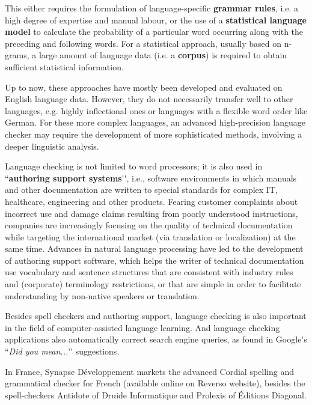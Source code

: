 \documentclass[]{../metanetpaper}
\begin{document}
\begin{multicols}{2}
This either requires the formulation of language-specific {\bf grammar
rules}, i.e. a high degree of expertise and manual labour, or the use
of a {\bf statistical language model} to calculate the probability of a
particular word occurring along with the preceding and following
words. For a statistical approach, usually based on n-grams, a large
amount of language data (i.e. a {\bf corpus}) is required to obtain
sufficient statistical information.  

Up to now, these approaches have mostly been developed and evaluated
on English language data. However, they do not necessarily transfer
well to other languages, e.g. highly inflectional ones or languages
with a flexible word order like German. For these more complex
languages, an advanced high-precision language checker may require the
development of more sophisticated methods, involving a deeper
linguistic analysis.

Language checking is not limited to word processors; it is also used
in ``{\bf authoring support systems}{\mbox '}{\mbox '}, i.e., software environments in which
manuals and other documentation are written to special standards for
complex IT, healthcare, engineering and other products. Fearing
customer complaints about incorrect use and damage claims resulting
from poorly understood instructions, companies are increasingly
focusing on the quality of technical documentation while targeting the
international market (via translation or localization) at the same
time. Advances in natural language processing have led to the
development of authoring support software, which helps the writer of
technical documentation use vocabulary and sentence structures that
are consistent with industry rules and (corporate) terminology
restrictions, or that are simple in order to facilitate understanding
by non-native speakers or translation.

Besides spell checkers and authoring support, language checking is
also important in the field of computer-assisted language
learning. And language checking applications also automatically
correct search engine queries, as found in Google{\mbox '}s ``{\it Did you mean...}{\mbox '}{\mbox '}
suggestions.

In France, Synapse Développement markets the advanced Cordial spelling
and grammatical checker for French (available online on Reverso
website), besides the spell-checkers Antidote of Druide Informatique
and Prolexis of Éditions Diagonal.


\end{multicols}
\end{document}
